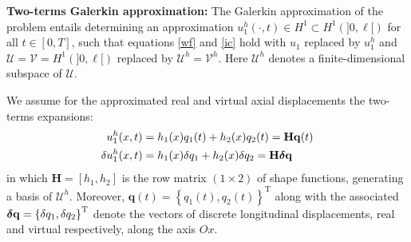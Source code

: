 \documentclass[12pt]{article}
\begin{document}
        \textbf{Two-terms Galerkin approximation:} The Galerkin approximation of the problem entails determining an approximation \( u_1^h(\cdot,t) \in H^1 \subset H^1(]0, \ell[) \) for all \( t \in [0, T] \), such that equations \eqref{wf} and \eqref{ic} hold with \( u_1 \) replaced by \( u_1^h \) and $\mathcal U=\mathcal V=H^1(]0, \ell[)$ replaced by $\mathcal U^{h}=\mathcal V^{h}$. Here $\mathcal U^{h}$ denotes a finite-dimensional subspace of $\mathcal U$.

We assume for the approximated real and virtual axial displacements the two-terms expansions:
\begin{equation}\label{approx}
    \begin{aligned}
        u_1^h(x,t)        & =h_1(x) q_1(t)+h_2(x) q_2(t)=\mathbf{H} \mathbf{q}(t)                     \\
        \delta u_1^h(x,t) & =h_1(x)  \delta q_1 +h_2(x)  \delta q_2 =\mathbf{H} \boldsymbol\delta \mathbf{q}
    \end{aligned}
\end{equation}
in which $\mathbf{H}=\left[h_1, h_2\right]$ is the row matrix $(1 \times 2)$ of shape functions, generating a basis of $\mathcal U^{h}$. Moreover, $\mathbf{q}(t)=\left\{q_1(t), q_2(t)\right\}^{\mathrm{T}}$ along with the associated $\boldsymbol\delta \mathbf{q}=\left\{\delta q_1, \delta q_2\right\}^{\mathrm{T}}$ denote the vectors of discrete longitudinal displacements, real and virtual respectively, along the axis $Ox$.
\end{document}
